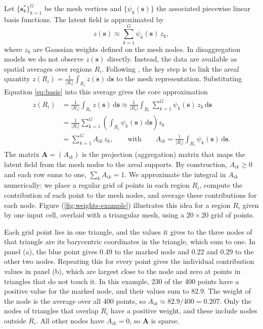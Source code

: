 Let \(\{\mathbf{s}^*_k\}_{k=1}^G\) be the mesh vertices and \(\{\psi_k(\mathbf{s})\}\) the associated piecewise linear basis functions. The latent field is approximated by
\begin{equation}
z(\mathbf{s}) \approx \sum_{k=1}^{G}\psi_k(\mathbf{s})\,z_k,
\label{eq:basis}
\end{equation}
where \(z_k\) are Gaussian weights defined on the mesh nodes. In disaggregation models we do not observe \(z(\mathbf{s})\) directly. Instead, the data are available as spatial averages over regions \(R_i\). Following \citep{moraga2017geostatistical}, the key step is to link the areal quantity \(z(R_i)=\frac{1}{|R_i|}\int_{R_i}z(\mathbf{s})\,\mathrm{d}\mathbf{s}\) to the mesh representation. Substituting Equation \eqref{eq:basis} into this average gives the core approximation
\begin{align}
\begin{split}
z(R_i)
&= \frac{1}{|R_i|}\int_{R_i} z(\mathbf{s})\,\mathrm{d}\mathbf{s}
 \approx \frac{1}{|R_i|}\int_{R_i} \sum_{k=1}^{G} \psi_k(\mathbf{s})\,z_k \,\mathrm{d}\mathbf{s} \\
&= \frac{1}{|R_i|}\sum_{k=1}^{G}\left(\int_{R_i} \psi_k(\mathbf{s})\,\mathrm{d}\mathbf{s}\right)z_k \\
&= \sum_{k=1}^{G} A_{ik}\,z_k,
\qquad \text{with}\qquad
A_{ik}=\frac{1}{|R_i|}\int_{R_i} \psi_k(\mathbf{s})\,\mathrm{d}\mathbf{s}.
\end{split}
\label{eq:des}
\end{align}
The matrix \(\mathbf{A}=(A_{ik})\) is the projection (aggregation) matrix that maps the latent field from the mesh nodes to the areal supports. By construction, \(A_{ik}\ge 0\) and each row sums to one, \(\sum_k A_{ik}=1\). We approximate the integral in \(A_{ik}\) numerically: we place a regular grid of points in each region \(R_i\), compute the contribution of each point to the mesh nodes, and average these contributions for each node. Figure (\ref{fig:weights-example}) illustrates this idea for a region \(R_i\) given by one input cell, overlaid with a triangular mesh, using a \(20 \times 20\) grid of points.

Each grid point lies in one triangle, and the values it gives to the three nodes of that triangle are its barycentric coordinates in the triangle, which sum to one. In panel (a), the blue point gives 0.49 to the marked node and 0.22 and 0.29 to the other two nodes. Repeating this for every point gives the individual contribution values in panel (b), which are largest close to the node and zero at points in triangles that do not touch it. In this example, 230 of the 400 points have a positive value for the marked node, and their values sum to 82.9. The weight of the node is the average over all 400 points, so \(A_{ik} \approx 82.9/400 = 0.207\). Only the nodes of triangles that overlap \(R_i\) have a positive weight, and these include nodes outside \(R_i\). All other nodes have \(A_{ik}=0\), so \(\mathbf{A}\) is sparse.

